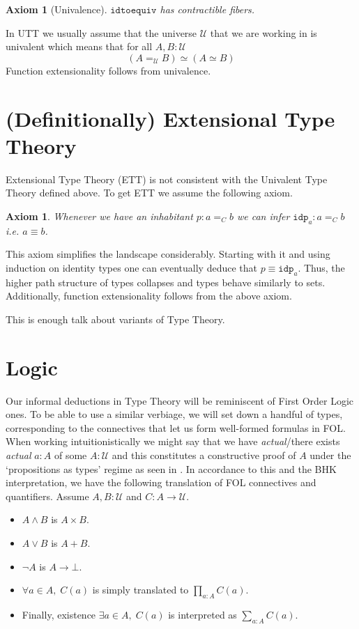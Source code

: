 \documentclass[12pt]{report}
\newtheorem{axiom}[thm]{Axiom}
\theoremstyle{definition}
\begin{document}
\begin{axiom}[Univalence]
$\mathtt{idtoequiv}$ has contractible fibers.
\end{axiom}
In UTT we usually assume that the universe $\mathcal{U}$ that we are working in is univalent which means that for all $A,B: \mathcal{U}$
$$(A=_\mathcal{U}B) \simeq (A \simeq B)$$
Function extensionality follows from univalence. 

\section{(Definitionally) Extensional Type Theory}
Extensional Type Theory (ETT) is not consistent with the Univalent Type Theory defined above. 
To get ETT we assume the following axiom. 
\begin{axiom}
Whenever we have an inhabitant $p : a=_C b$ we can infer $\mathtt{idp}_a : a=_C b$ i.e. $a \equiv b$. 
\end{axiom}
This axiom simplifies the landscape considerably. 
Starting with it and using induction on identity types one can eventually deduce that $p \equiv \mathtt{idp}_a$. 
Thus, the higher path structure of types collapses and types behave similarly to sets. 
Additionally, function extensionality follows from the above axiom. 

This is enough talk about variants of Type Theory. 

\section{Logic}
Our informal deductions in Type Theory will be reminiscent of First Order Logic ones. 
To be able to use a similar verbiage, we will set down a handful of types, corresponding to the connectives that let us form well-formed formulas in FOL. 
When working intuitionistically we might say that we have \textit{actual}/there exists \textit{actual} $a : A$ of some $A : \mathcal{U}$ 
and this constitutes a constructive proof of $A$ under the `propositions as types' regime as seen in \cite{hottbook}. 
In accordance to this and the BHK interpretation, we have the following translation of FOL connectives and quantifiers. 
Assume $A, B : \mathcal{U}$ and $C : A \rightarrow \mathcal{U}$.
\begin{itemize}
\item $A \wedge B$ is $A \times B$.
\item $A \vee B$ is $A+ B$.
\item $\neg A$ is $A \rightarrow \bot$. 
\item $\forall a\in A,\; C(a)$ is simply translated to $\prod_{a : A}C(a)$. 
\item Finally, existence $ \exists a \in A,\; C(a)$ is interpreted as $\sum_{a : A}C(a)$.
\end{itemize}
\end{document}
